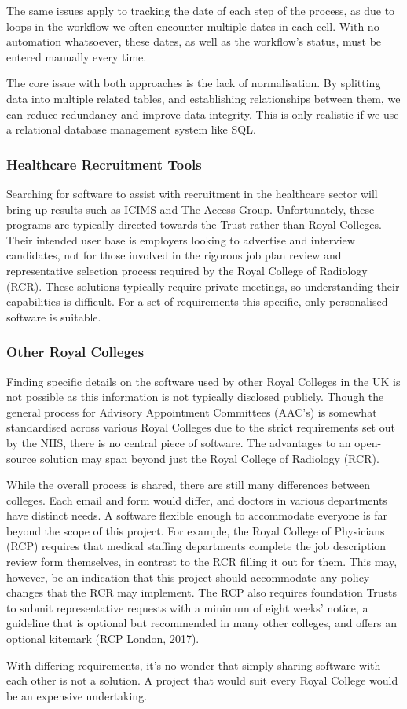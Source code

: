 \begin{multicols}{2}
The same issues apply to tracking the date of each step of the process, as due to loops in the workflow we often encounter multiple dates in each cell. With no automation whatsoever, these dates, as well as the workflow’s status, must be entered manually every time.

The core issue with both approaches is the lack of normalisation. By splitting data into multiple related tables, and establishing relationships between them, we can reduce redundancy and improve data integrity. This is only realistic if we use a relational database management system like SQL.
\subsubsection{Healthcare Recruitment Tools}
Searching for software to assist with recruitment in the healthcare sector will bring up results such as ICIMS and The Access Group. Unfortunately, these programs are typically directed towards the Trust rather than Royal Colleges. Their intended user base is employers looking to advertise and interview candidates, not for those involved in the rigorous job plan review and representative selection process required by the Royal College of Radiology (RCR). These solutions typically require private meetings, so understanding their capabilities is difficult. For a set of requirements this specific, only personalised software is suitable.
\subsubsection{Other Royal Colleges}
Finding specific details on the software used by other Royal Colleges in the UK is not possible as this information is not typically disclosed publicly. Though the general process for Advisory Appointment Committees (AAC’s) is somewhat standardised across various Royal Colleges due to the strict requirements set out by the NHS, there is no central piece of software. The advantages to an open-source solution may span beyond just the Royal College of Radiology (RCR). 

While the overall process is shared, there are still many differences between colleges. Each email and form would differ, and doctors in various departments have distinct needs. A software flexible enough to accommodate everyone is far beyond the scope of this project. For example, the Royal College of Physicians (RCP) requires that medical staffing departments complete the job description review form themselves, in contrast to the RCR filling it out for them. This may, however, be an indication that this project should accommodate any policy changes that the RCR may implement. The RCP also requires foundation Trusts to submit representative requests with a minimum of eight weeks’ notice, a guideline that is optional but recommended in many other colleges, and offers an optional kitemark (RCP London, 2017).

With differing requirements, it’s no wonder that simply sharing software with each other is not a solution. A project that would suit every Royal College would be an expensive undertaking.
\end{multicols}
